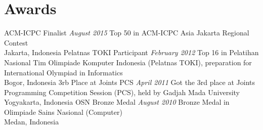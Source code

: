 \documentclass[letterpaper]{moderncv}        %
\begin{document}
\section{Awards}
\cventry
{}
{ACM-ICPC Finalist}
{}
{\textit{August 2015}}
{}
{Top 50 in ACM-ICPC Asia Jakarta Regional Contest\\Jakarta, Indonesia}
\vspace{1mm}
\cventry
{}
{Pelatnas TOKI Participant}
{}
{\textit{February 2012}}
{}
{Top 16 in Pelatihan Nasional Tim Olimpiade Komputer Indonesia (Pelatnas TOKI), preparation for International Olympiad in Informatics\\Bogor, Indonesia}
\vspace{1mm}
\cventry
{}
{3rb Place at Joints PCS}
{}
{\textit{April 2011}}
{}
{Got the 3rd place at Joints Programming Competition Session (PCS), held by Gadjah Mada University\\Yogyakarta, Indonesia}
\vspace{1mm}
\cventry
{}
{OSN Bronze Medal}
{}
{\textit{August 2010}}
{}
{Bronze Medal in Olimpiade Sains Nasional (Computer)\\Medan, Indonesia}
\vspace{1mm}
\ 
\end{document}
